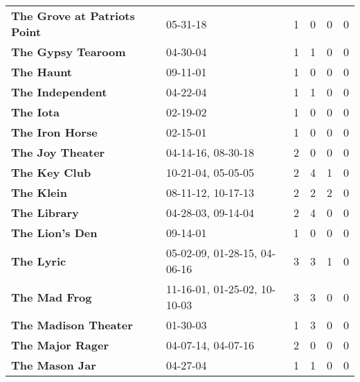 \begin{supertabular}{llllll}
                                 \textbf{The Grove at Patriots Point} &                      05-31-18 &  1 &   0 &  0 &  0 \\
                                           \textbf{The Gypsy Tearoom} &                      04-30-04 &  1 &   1 &  0 &  0 \\
                                                   \textbf{The Haunt} &                      09-11-01 &  1 &   0 &  0 &  0 \\
                                             \textbf{The Independent} &                      04-22-04 &  1 &   1 &  0 &  0 \\
                                                    \textbf{The Iota} &                      02-19-02 &  1 &   0 &  0 &  0 \\
                                              \textbf{The Iron Horse} &                      02-15-01 &  1 &   0 &  0 &  0 \\
                                            \textbf{The Joy  Theater} &            04-14-16, 08-30-18 &  2 &   0 &  0 &  0 \\
                                                \textbf{The Key Club} &            10-21-04, 05-05-05 &  2 &   4 &  1 &  0 \\
                                                   \textbf{The Klein} &            08-11-12, 10-17-13 &  2 &   2 &  2 &  0 \\
                                                 \textbf{The Library} &            04-28-03, 09-14-04 &  2 &   4 &  0 &  0 \\
                                              \textbf{The Lion's Den} &                      09-14-01 &  1 &   0 &  0 &  0 \\
                                                   \textbf{The Lyric} &  05-02-09, 01-28-15, 04-06-16 &  3 &   3 &  1 &  0 \\
                                                \textbf{The Mad Frog} &  11-16-01, 01-25-02, 10-10-03 &  3 &   3 &  0 &  0 \\
                                         \textbf{The Madison Theater} &                      01-30-03 &  1 &   3 &  0 &  0 \\
                                             \textbf{The Major Rager} &            04-07-14, 04-07-16 &  2 &   0 &  0 &  0 \\
                                               \textbf{The Mason Jar} &                      04-27-04 &  1 &   1 &  0 &  0 \\

\end{supertabular}
